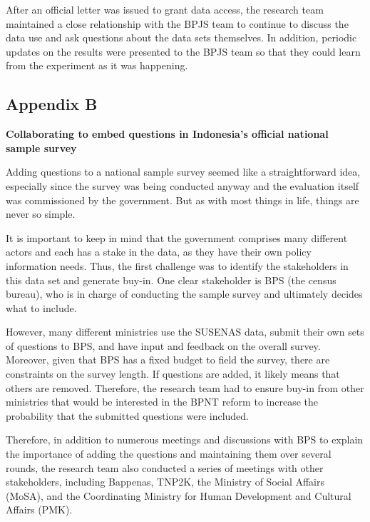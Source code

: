 After an official letter was issued to grant data access, the research team maintained a close relationship with the BPJS team to continue to discuss the data use and ask questions about the data sets themselves. In addition, periodic updates on the results were presented to the BPJS team so that they could learn from the experiment as it was happening.

\hypertarget{indonesia-appendixb}{%
\subsection*{Appendix B}\label{indonesia-appendixb}}

\textbf{Collaborating to embed questions in Indonesia's official national sample survey}

Adding questions to a national sample survey seemed like a straightforward idea, especially since the survey was being conducted anyway and the evaluation itself was commissioned by the government. But as with most things in life, things are never so simple.

It is important to keep in mind that the government comprises many different actors and each has a stake in the data, as they have their own policy information needs. Thus, the first challenge was to identify the stakeholders in this data set and generate buy-in. One clear stakeholder is BPS (the census bureau), who is in charge of conducting the sample survey and ultimately decides what to include.

However, many different ministries use the SUSENAS data, submit their own sets of questions to BPS, and have input and feedback on the overall survey. Moreover, given that BPS has a fixed budget to field the survey, there are constraints on the survey length. If questions are added, it likely means that others are removed. Therefore, the research team had to ensure buy-in from other ministries that would be interested in the BPNT reform to increase the probability that the submitted questions were included.

Therefore, in addition to numerous meetings and discussions with BPS to explain the importance of adding the questions and maintaining them over several rounds, the research team also conducted a series of meetings with other stakeholders, including Bappenas, TNP2K, the Ministry of Social Affairs (MoSA), and the Coordinating Ministry for Human Development and Cultural Affairs (PMK).

